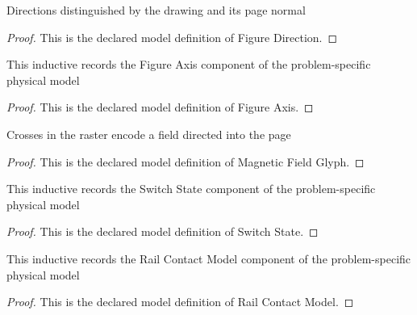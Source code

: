 \begin{definition}
  \label{def:physics:phyx-mini-0976:phyxminiproblems-problemphyxmini0976-figuredirection}
  Directions distinguished by the drawing and its page normal
\end{definition}
\begin{proof}
  This is the declared model definition of Figure Direction.
\end{proof}
\begin{definition}
  \label{def:physics:phyx-mini-0976:phyxminiproblems-problemphyxmini0976-figureaxis}
  This inductive records the Figure Axis component of the problem-specific physical model
\end{definition}
\begin{proof}
  This is the declared model definition of Figure Axis.
\end{proof}
\begin{definition}
  \label{def:physics:phyx-mini-0976:phyxminiproblems-problemphyxmini0976-magneticfieldglyph}
  Crosses in the raster encode a field directed into the page
\end{definition}
\begin{proof}
  This is the declared model definition of Magnetic Field Glyph.
\end{proof}
\begin{definition}
  \label{def:physics:phyx-mini-0976:phyxminiproblems-problemphyxmini0976-switchstate}
  This inductive records the Switch State component of the problem-specific physical model
\end{definition}
\begin{proof}
  This is the declared model definition of Switch State.
\end{proof}
\begin{definition}
  \label{def:physics:phyx-mini-0976:phyxminiproblems-problemphyxmini0976-railcontactmodel}
  This inductive records the Rail Contact Model component of the problem-specific physical model
\end{definition}
\begin{proof}
  This is the declared model definition of Rail Contact Model.
\end{proof}
